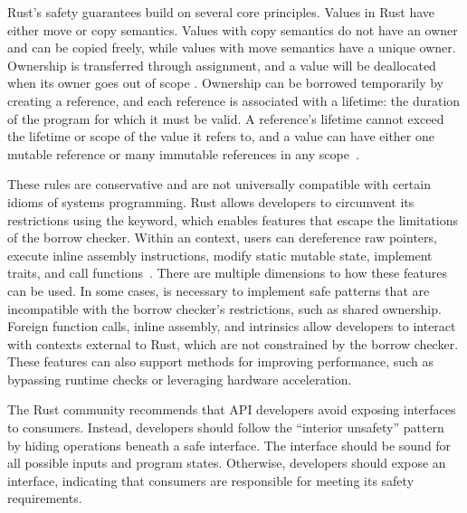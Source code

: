Rust's safety guarantees build on several core principles. Values in Rust have either move or copy semantics. Values with copy semantics do not have an owner and can be copied freely, while values with move semantics have a unique owner. Ownership is transferred through assignment, and a value will be deallocated when its owner goes out of scope \cite{rustbook}.  Ownership can be borrowed temporarily by creating a reference, and each reference is associated with a lifetime: the duration of the program for which it must be valid. A reference's lifetime cannot exceed the lifetime or scope of the value it refers to, and a value can have either one mutable reference or many immutable references in any scope~\cite{crichton20}.

These rules are conservative and are not universally compatible with certain idioms of systems programming. Rust allows developers to circumvent its restrictions using the \unsafe keyword, which enables features that escape the limitations of the borrow checker. Within an \unsafe context, users can dereference raw pointers, execute inline assembly instructions, modify static mutable state, implement \unsafe traits, and call \unsafe functions~\cite{rustbook}. There are multiple dimensions to how these features can be used. In some cases, \unsafe is necessary to implement safe patterns that are incompatible with the borrow checker's restrictions, such as shared ownership. Foreign function calls, inline assembly, and intrinsics allow developers to interact with contexts external to Rust, which are not constrained by the borrow checker. These features can also support methods for improving performance, such as bypassing runtime checks or leveraging hardware acceleration.

The Rust community recommends that API developers avoid exposing \unsafe interfaces to consumers. Instead, developers should follow the ``interior unsafety'' pattern~\cite{qin20} by hiding \unsafe operations beneath a safe interface. The interface should be sound for all possible inputs and program states. Otherwise, developers should expose an \unsafe interface, indicating that consumers are responsible for meeting its safety requirements.



